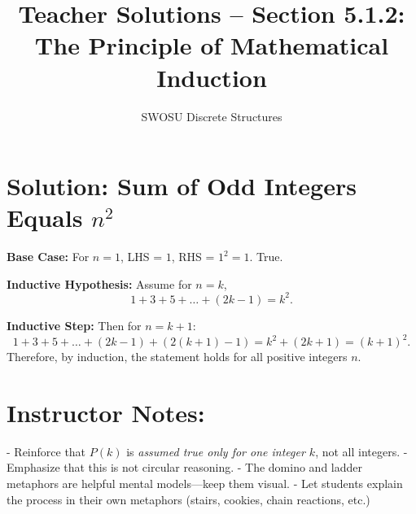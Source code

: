 \documentclass[12pt]{article}
\title{Teacher Solutions – Section 5.1.2: The Principle of Mathematical Induction}
\author{SWOSU Discrete Structures}
\date{}
\begin{document}
\maketitle

\section*{Solution: Sum of Odd Integers Equals $n^2$}

\textbf{Base Case:} For $n=1$, LHS = $1$, RHS = $1^2 = 1$. True.

\textbf{Inductive Hypothesis:}  
Assume for $n=k$,  
\[
1 + 3 + 5 + \dots + (2k - 1) = k^2.
\]

\textbf{Inductive Step:}  
Then for $n = k+1$:
\[
1 + 3 + 5 + \dots + (2k - 1) + (2(k+1) - 1)
= k^2 + (2k + 1)
= (k+1)^2.
\]
Therefore, by induction, the statement holds for all positive integers $n$.

\section*{Instructor Notes:}
- Reinforce that $P(k)$ is \textit{assumed true only for one integer $k$}, not all integers.
- Emphasize that this is not circular reasoning.
- The domino and ladder metaphors are helpful mental models—keep them visual.
- Let students explain the process in their own metaphors (stairs, cookies, chain reactions, etc.)
\end{document}
